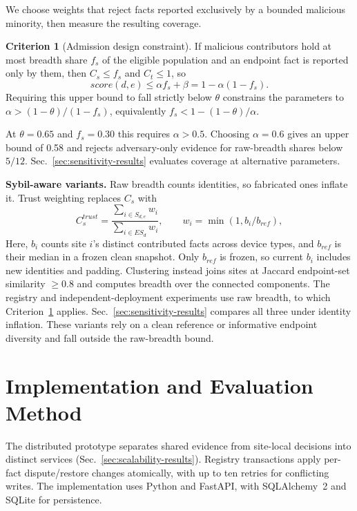 \documentclass[journal]{IEEEtran}
\theoremstyle{definition}
\newtheorem{criterion}{Criterion}
\begin{document}
We choose weights that reject facts reported exclusively by a bounded malicious minority, then measure the resulting coverage.

\begin{criterion}[Admission design constraint]
\label{crit:poison-bound}
If malicious contributors hold at most breadth share $f_s$ of the eligible population and an endpoint fact is reported only by them, then $C_s\le f_s$ and $C_t\le1$, so
\begin{equation}
score(d,e)\le\alpha f_s+\beta
=1-\alpha(1-f_s).
\label{eq:poisonbound}
\end{equation}
Requiring this upper bound to fall strictly below $\theta$ constrains the parameters to $\alpha>(1-\theta)/(1-f_s)$, equivalently $f_s<1-(1-\theta)/\alpha$.
\end{criterion}

At $\theta=0.65$ and $f_s=0.30$ this requires $\alpha>0.5$. Choosing $\alpha=0.6$ gives an upper bound of 0.58 and rejects adversary-only evidence for raw-breadth shares below $5/12$. Sec.~\ref{sec:sensitivity-results} evaluates coverage at alternative parameters.

\textbf{Sybil-aware variants.} Raw breadth counts identities, so fabricated ones inflate it. Trust weighting replaces $C_s$ with
\[
C_s^{trust}=\frac{\sum_{i\in S_{d,e}}w_i}{\sum_{i\in ES_d}w_i},\qquad w_i=\min(1,b_i/b_{ref}),
\]
Here, $b_i$ counts site $i$'s distinct contributed facts across device types, and $b_{ref}$ is their median in a frozen clean snapshot. Only $b_{ref}$ is frozen, so current $b_i$ includes new identities and padding. Clustering instead joins sites at Jaccard endpoint-set similarity $\ge0.8$ and computes breadth over the connected components. The registry and independent-deployment experiments use raw breadth, to which Criterion~\ref{crit:poison-bound} applies. Sec.~\ref{sec:sensitivity-results} compares all three under identity inflation. These variants rely on a clean reference or informative endpoint diversity and fall outside the raw-breadth bound.

\section{Implementation and Evaluation Method}
\label{sec:impl}
The distributed prototype separates shared evidence from site-local decisions into distinct services (Sec.~\ref{sec:scalability-results}). Registry transactions apply per-fact dispute/restore changes atomically, with up to ten retries for conflicting writes. The implementation uses Python and FastAPI, with SQLAlchemy~2 and SQLite for persistence.
\end{document}
